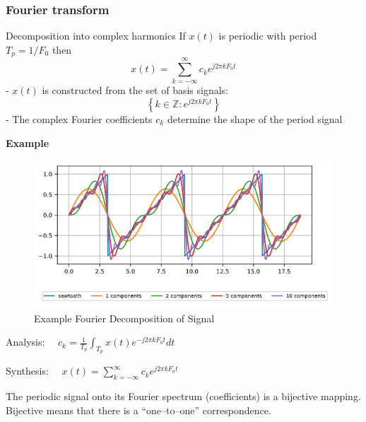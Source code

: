 \subsubsection{Fourier transform}
Decomposition into complex harmonics
If $x(t)$ is periodic with period $T_p=1 / F_0$ then
$$
x(t)=\sum_{k=-\infty}^{\infty} c_k e^{j 2 \pi k F_0 t}
$$
- $x(t)$ is constructed from the set of basis signals:
$$
\left\{k \in \mathbb{Z}: e^{j 2 \pi k F_0 t}\right\}
$$
- The complex Fourier coefficients $c_k$ determine the shape of the period signal

\clearpage
\textbf{Example}
\begin{figure}[h!]
    \centering
    \includegraphics[width=\textwidth]{img/fourier.PNG}
    \caption{Example Fourier Decomposition of Signal}
    \label{fig:fourier}
\end{figure}
\noindent
\begin{center}
Analysis: $\quad c_k=\frac{1}{T_p} \int_{T_p} x(t) e^{-j 2 \pi k F_0 t} d t$

Synthesis: $\quad x(t)=\sum_{k=-\infty}^{\infty} c_k e^{j 2 \pi k F_0 t}$
\end{center}
The periodic signal onto its Fourier spectrum (coefficients) is a bijective mapping. Bijective
means that there is a “one–to–one” correspondence.